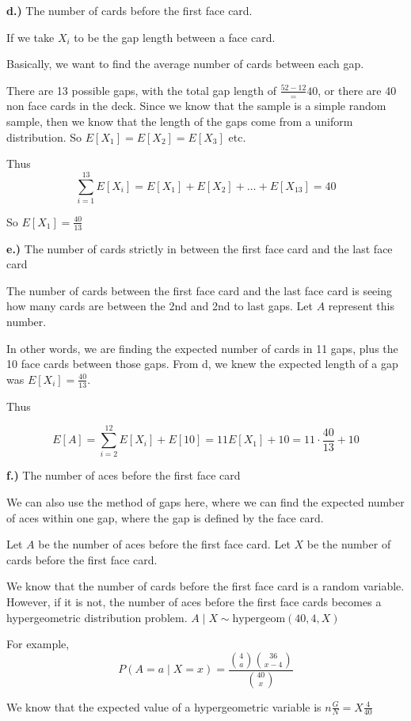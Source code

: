\documentclass{report}
\begin{document}
\noindent
\textbf{d.)} The number of cards before the first face card. 

If we take $ X_i $ to be the gap length between a face card.

Basically, we want to find the average number of cards between each gap. 

There are 13 possible gaps, with the total gap length of $ \frac{52-12} =40$, or there are 40 non face cards in the deck.  Since we know that the sample is a simple random sample, then we know that the length of the gaps come from a uniform distribution. So $ E[X_1] = E[X_2] = E[X_3] $ etc.

Thus $$ \sum_{i=1}^{13} E[X_i] = E[X_1] + E[X_2] + \dots + E[X_{13}] = 40 $$

So $ \boxed{E[X_1] = \frac{40}{13}} $ 




\noindent
\textbf{e.)} The number of cards strictly in between the first face card and the last face card

The number of cards between the first face card and the last face card is seeing how many cards are between the 2nd and 2nd to last gaps. Let $ A $ represent this number. 

In other words, we are finding the expected number of cards in 11 gaps, plus the 10 face cards between those gaps. From d, we knew the expected length of a gap was $E[X_i]= \frac{40}{13} $. 

Thus

$$  E[A] = \sum_{i=2}^{12} E[X_i] + E[10] = 11E[X_1] + 10 = 11 \cdot \frac{40}{13} + 10 $$

\noindent
\textbf{f.)} The number of aces before the first face card

We can also use the method of gaps here, where we can find the expected number of aces within one gap, where the gap is defined by the face card. 

Let $ A $ be the number of aces before the first face card. Let $ X $ be the number of cards before the first face card. 


We know that the number of cards before the first face card is a random variable. However, if it is not, the number of aces before the first face cards becomes a hypergeometric distribution problem.  $ A \mid X \sim \text{hypergeom}(40, 4, X) $

For example, 
$$P(A = a \mid X = x ) = \frac{\binom{4}{a}\binom{36}{x-4}}{\binom{40}{x}}$$

We know that the expected value of a hypergeometric variable is $ n \frac{G}{N} = X \frac{4}{40}$ 
\end{document}
